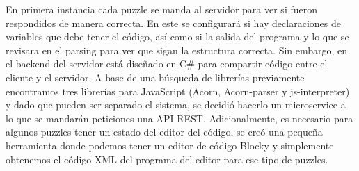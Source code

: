 En primera instancia cada puzzle se manda al servidor para ver si fueron respondidos de manera correcta. En este se configurará si hay declaraciones de variables que debe tener el código, así como si la salida del programa y lo que se revisara en el parsing para ver que sigan la estructura correcta. Sin embargo, en el backend del servidor está diseñado en C# para compartir código entre el cliente y el servidor. A base de una búsqueda de librerías previamente encontramos tres librerías para JavaScript (Acorn, Acorn-parser y js-interpreter) y dado que pueden ser separado el sistema, se decidió hacerlo un microservice a lo que se mandarán peticiones una API REST. Adicionalmente, es necesario para algunos puzzles tener un estado del editor del código, se creó una pequeña herramienta donde podemos tener un editor de código Blocky y simplemente obtenemos el código XML del programa del editor para ese tipo de puzzles.
